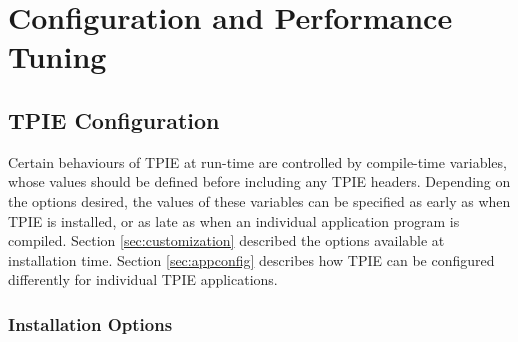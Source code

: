\chapter{Configuration and Performance Tuning}
\label{sec:tuning}\label{sec:configuration}


\section{TPIE Configuration}
Certain behaviours of TPIE at run-time are controlled by
compile-time variables, whose values should be defined
before including any TPIE headers. Depending on the options
desired, the values of these
variables can be specified as early as when TPIE is
installed, or as late as when an individual application
program is compiled. Section \ref{sec:customization}
described the options available at installation
time. Section \ref{sec:appconfig} describes how TPIE can be
configured differently for individual
TPIE applications.

\subsection{Installation Options}
 \label{sec:customization}

